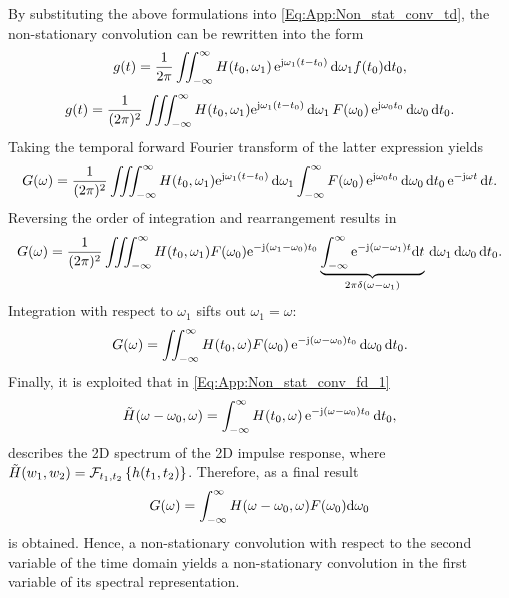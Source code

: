By substituting the above formulations into \eqref{Eq:App:Non_stat_conv_td}, the non-stationary convolution can be rewritten into the form
\begin{equation}
g(t) = \frac{1}{2\pi} \iint_{-\infty}^{\infty}  H(t_0,\omega_1) \, \te^{\ti \omega_1(t-t_0)} \, \td \omega_1 f(t_0) \td t_0,
\end{equation}
\begin{equation}
g(t) = \frac{1}{(2\pi)^2} \iiint_{-\infty}^{\infty}  H(t_0,\omega_1) \te^{\ti \omega_1(t-t_0)} \, \td \omega_1  \, F(\omega_0) \, \te^{\ti \omega_0 t_0} \, \td \omega_0 \, \td t_0.
\end{equation}
Taking the temporal forward Fourier transform of the latter expression yields
\begin{equation}
G(\omega) =\frac{1}{(2\pi)^2} \iiint_{-\infty}^{\infty} H(t_0,\omega_1) \te^{\ti \omega_1(t-t_0)} \, \td \omega_1 \int_{-\infty}^{\infty} F(\omega_0) \, \te^{\ti \omega_0 t_0} \, \td \omega_0 \, \td t_0 \, \te^{-\ti \omega t} \, \td t.
\end{equation}
Reversing the order of integration and rearrangement results in
\begin{equation}
G(\omega) =\frac{1}{(2\pi)^2} \iiint_{-\infty}^{\infty} H(t_0,\omega_1) F(\omega_0)  \te^{-\ti (\omega_1-\omega_0) t_0}  
\underbrace{ \int_{-\infty}^{\infty}  \te^{-\ti (\omega-\omega_1) t}  \td t}_{2\pi \delta(\omega-\omega_1)}
 \, \td \omega_1 \,  \td \omega_0 \, \td t_0.
\end{equation}
Integration with respect to $\omega_1$ sifts out $\omega_1 = \omega$:
\begin{equation}
\label{Eq:App:Non_stat_conv_fd_1}
G(\omega) =  \iint_{-\infty}^{\infty} H(t_0,\omega) F(\omega_0)  \, \te^{-\ti (\omega-\omega_0) t_0}  \, \td \omega_0 \, \td t_0.
\end{equation}
Finally, it is exploited that in \eqref{Eq:App:Non_stat_conv_fd_1} 
\begin{equation}
\tilde{H}(\omega-\omega_0,\omega) =  \int_{-\infty}^{\infty}  H(t_0,\omega) \, \te^{-\ti (\omega-\omega_0) t_0} \, \td t_0,
\end{equation}
describes the 2D spectrum of the 2D impulse response, where $\tilde{H}(w_1,w_2) = \FT[t_1,t_2]{h(t_1,t_2)}$.
Therefore, as a final result
\begin{equation}
G(\omega) =  \int_{-\infty}^{\infty} H(\omega - \omega_0,\omega) F(\omega_0)  \td \omega_0
\label{Eq:App:Non_stat_conv_fd}
\end{equation}
is obtained.
Hence, a non-stationary convolution with respect to the second variable of the time domain yields a non-stationary convolution in the first variable of its spectral representation.